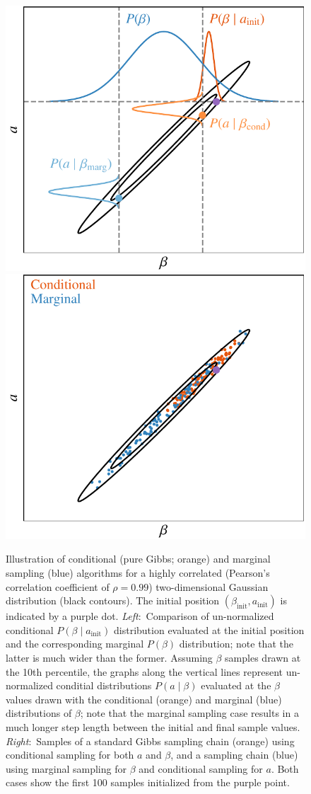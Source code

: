 \documentclass[twocolumn]{aa}
\begin{document}
\begin{figure}
  \center	
  \includegraphics[width=0.46\linewidth]{figs/cond_vs_marg_graph_plot_v3.pdf}\hspace*{1cm}
  \includegraphics[width=0.46\linewidth]{figs/cond_vs_marg_scatt_plot_seed12350.pdf}
  \caption{Illustration of conditional (pure Gibbs; orange) and marginal
    sampling (blue) algorithms for a highly correlated (Pearson's
    correlation coefficient of $\rho=0.99$) two-dimensional Gaussian
    distribution (black contours). The initial position $(\beta_{\mathrm{init}},a_{\mathrm{init}})$ is
    indicated by a purple dot. \emph{Left}:~Comparison of un-normalized
    conditional $P(\beta\mid a_{\mathrm{init}})$ distribution evaluated at the initial position
    and the corresponding marginal $P(\beta)$ distribution; note that the
    latter is much wider than the former. Assuming $\beta$ samples drawn
    at the 10th percentile, the graphs along the vertical lines
    represent un-normalized conditial distributions $P(a\mid\beta)$ evaluated
    at the $\beta$ values drawn with the
    conditional (orange) and marginal (blue) distributions of $\beta$;
    note that the marginal sampling case results in a much longer step
    length between the initial and final sample values.
    \emph{Right}:~Samples of a
    standard Gibbs sampling chain (orange) using conditional sampling for
    both $a$ and $\beta$, and a sampling chain (blue) using marginal
    sampling for $\beta$ and conditional sampling for $a$. Both cases
    show the first 100 samples initialized from the purple point.  }
  \label{fig:marginal_conditional_plot}
\end{figure}
\end{document}

